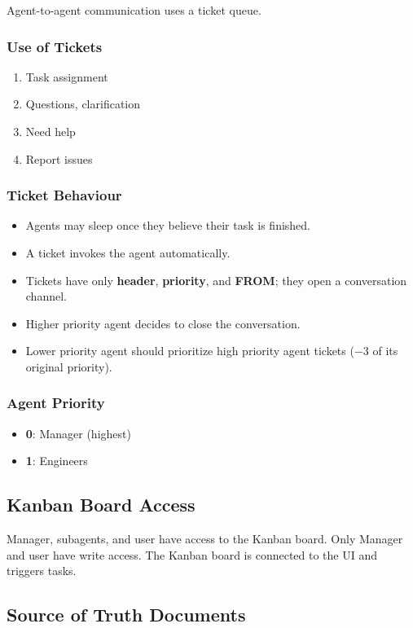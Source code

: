 \documentclass[11pt,a4paper]{article}
\begin{document}
Agent-to-agent communication uses a ticket queue.

\subsubsection{Use of Tickets}
\begin{enumerate}
  \item Task assignment
  \item Questions, clarification
  \item Need help
  \item Report issues
\end{enumerate}

\subsubsection{Ticket Behaviour}
\begin{itemize}
  \item Agents may sleep once they believe their task is finished.
  \item A ticket invokes the agent automatically.
  \item Tickets have only \textbf{header}, \textbf{priority}, and \textbf{FROM}; they open a conversation channel.
  \item Higher priority agent decides to close the conversation.
  \item Lower priority agent should prioritize high priority agent tickets ($-3$ of its original priority).
\end{itemize}

\subsubsection{Agent Priority}
\begin{itemize}
  \item \textbf{0}: Manager (highest)
  \item \textbf{1}: Engineers
\end{itemize}

\subsection{Kanban Board Access}

Manager, subagents, and user have access to the Kanban board. Only Manager and user have write access. The Kanban board is connected to the UI and triggers tasks.

\subsection{Source of Truth Documents}
\end{document}
